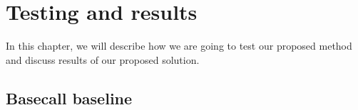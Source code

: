 \chapter{Testing and results}

\label{kap:testRes} %

In this chapter, we will describe how we are going to test our proposed method
and discuss results of our proposed solution.

\section{Basecall baseline}
